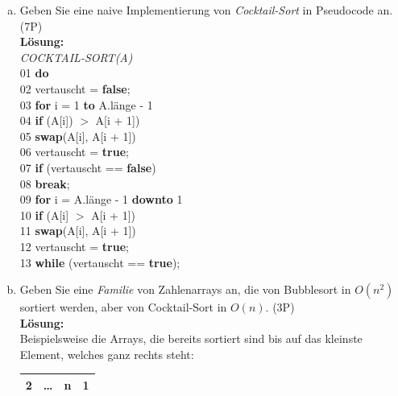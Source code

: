 \documentclass{scrartcl}
\begin{document}
\begin{enumerate}[(1)]
\begin{enumerate}[(a)]
\item Geben Sie eine naive Implementierung von \emph{Cocktail-Sort} in Pseudocode an. (7P)\\
\textbf{Lösung:}\\
\textit{COCKTAIL-SORT(A)}\\
01 \tab \textbf{do} \\
02 \tab \tab vertauscht = \textbf{false};\\
03 \tab \tab \textbf{for} i = 1 \textbf{to} A.länge - 1\\
04 \tab \tab \tab \textbf{if} (A[i]) $>$ A[i + 1])\\
05 \tab \tab \tab \tab \textbf{swap}(A[i], A[i + 1])\\
06 \tab \tab \tab \tab vertauscht = \textbf{true};\\
07 \tab \tab \textbf{if} (vertauscht == \textbf{false})\\
08 \tab \tab \tab \textbf{break};\\
09 \tab \tab \textbf{for} i = A.länge - 1 \textbf{downto} 1\\
10 \tab \tab \tab \textbf{if} (A[i] $>$ A[i + 1])\\
11 \tab \tab \tab \tab \textbf{swap}(A[i], A[i + 1])\\
12 \tab \tab \tab \tab vertauscht = \textbf{true};\\
13 \tab \textbf{while} (vertauscht == \textbf{true});
\item Geben Sie eine \emph{Familie} von Zahlenarrays an, die von Bubblesort in $O(n^2)$ sortiert werden, aber von Cocktail-Sort in $O(n)$. (3P)\\
\textbf{Lösung:}\\
Beispielsweise die Arrays, die bereits sortiert sind bis auf das kleinste Element, welches ganz rechts steht:
\text{ } \\
\begin{center}
\begin{tabular}{|c|c|c|c|}
\hline
2 & \ldots & n & 1 \\
\hline
\end{tabular}
\end{center}
\end{enumerate}
\end{enumerate}
\end{document}
